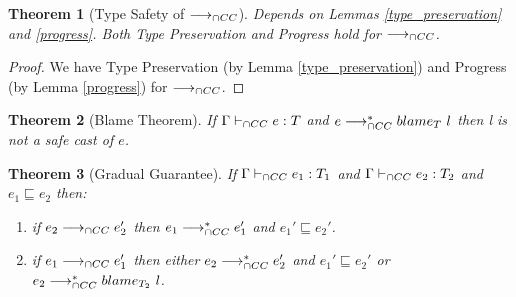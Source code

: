 \documentclass[a4paper]{article}
\newtheorem{theorem}{Theorem}
\begin{document}
\begin{theorem}[Type Safety of $\longrightarrow_{\cap CC}$]
\label{type_safety}
Depends on Lemmas \ref{type_preservation} and \ref{progress}.
Both Type Preservation and Progress hold for $\longrightarrow_{\cap CC}$.
\end{theorem}
\begin{proof}
We have Type Preservation (by Lemma \ref{type_preservation}) and Progress (by Lemma \ref{progress}) for $\longrightarrow_{\cap CC}$.
\end{proof}

\begin{theorem}[Blame Theorem]
\label{blame_theorem}
If $\Gamma \vdash_{\cap CC} e : T$ and $e \longrightarrow_{\cap CC}^* blame_{T}\ l$ then l is not a safe cast of $e$.
\end{theorem}

\begin{theorem}[Gradual Guarantee]
\label{gradual_guarantee}
If $\Gamma \vdash_{\cap CC} e_1 : T_1$ and $\Gamma \vdash_{\cap CC} e_2 : T_2$ and $e_1 \sqsubseteq e_2$ then:
\begin{enumerate}
    \item if $e_2 \longrightarrow_{\cap CC} e_2'$ then $e_1 \longrightarrow_{\cap CC}^* e_1'$ and $e_1' \sqsubseteq e_2'$.
    \item if $e_1 \longrightarrow_{\cap CC} e_1'$ then either $e_2 \longrightarrow_{\cap CC}^* e_2'$ and $e_1' \sqsubseteq e_2'$ or $e_2 \longrightarrow_{\cap CC}^* blame_{T_2}\ l$.
\end{enumerate}
\end{theorem}



\end{document}
